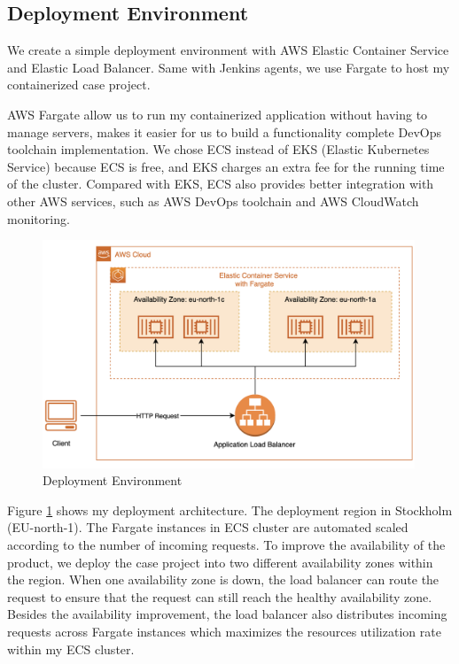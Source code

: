 \subsection{Deployment Environment}
We create a simple deployment environment with AWS Elastic Container Service and Elastic Load Balancer. Same with Jenkins agents, we use Fargate to host my containerized case project. 
\par
AWS Fargate allow us to run my containerized application without having to manage servers, makes it easier for us to build a functionality complete DevOps toolchain implementation. We chose ECS instead of EKS (Elastic Kubernetes Service) because ECS is free, and EKS charges an extra fee for the running time of the cluster. Compared with EKS, ECS also provides better integration with other AWS services, such as AWS DevOps toolchain and AWS CloudWatch monitoring.
\begin{figure}[h]
     \centering
     \includegraphics[width=0.99\textwidth]{pics/deploy.png}
     \caption{Deployment Environment}
     \label{fig:deploy}
\end{figure}
\par
Figure \ref{fig:deploy} shows my deployment architecture. The deployment region in Stockholm (EU-north-1). The Fargate instances in ECS cluster are automated scaled according to the number of incoming requests.
To improve the availability of the product, we deploy the case project into two different availability zones within the region.
When one availability zone is down, the load balancer can route the request to ensure that the request can still reach the healthy availability zone. Besides the availability improvement, the load balancer also distributes incoming requests across Fargate instances which maximizes the resources utilization rate within my ECS cluster.
